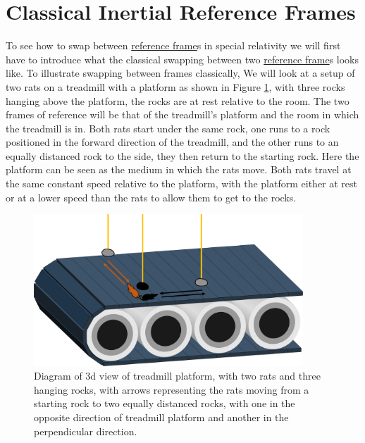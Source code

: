 


\section{Classical Inertial Reference Frames}

To see how to swap between \hyperlink{def-Reference-frame}{reference frame}s in special relativity we will first have to introduce what the classical swapping between two \hyperlink{def-Reference-frame}{reference frame}s looks like. To illustrate swapping between frames classically, We will look at a setup of two rats on a treadmill with a platform as shown in Figure \ref{fig: 3d conveyor belt}, with three rocks hanging above the platform, the rocks are at rest relative to the room. The two frames of reference will be that of the treadmill's platform and the room in which the treadmill is in. Both rats start under the same rock, one runs to a rock positioned in the forward direction of the treadmill, and the other runs to an equally distanced rock to the side, they then return to the starting rock. Here the platform can be seen as the medium in which the rats move. Both rats travel at the same constant speed relative to the platform, with the platform either at rest or at a lower speed than the rats to allow them to get to the rocks.

\begin{figure}[H]
	\centering
	\includegraphics[width=0.9\textwidth]{images/pdf/Conveyor_belt_3d.pdf}
	\caption{Diagram of 3d view of treadmill platform, with two rats and three hanging rocks, with arrows representing the rats moving from a starting rock to two equally distanced rocks, with one in the opposite direction of treadmill platform and another in the perpendicular direction.}
	\label{fig: 3d conveyor belt}
\end{figure}

